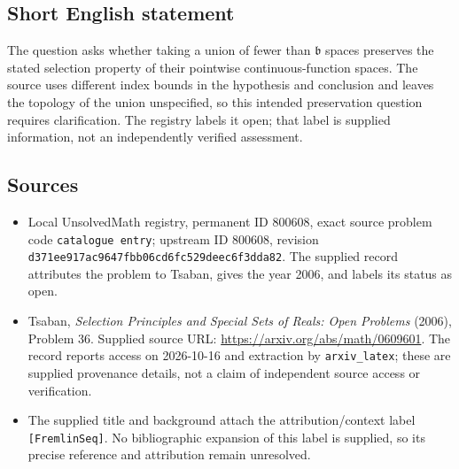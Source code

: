 \documentclass[11pt]{article}
\begin{document}
\subsection{Short English statement}
The question asks whether taking a union of fewer than \(\mathfrak b\) spaces preserves the stated selection property of their pointwise continuous-function spaces. The source uses different index bounds in the hypothesis and conclusion and leaves the topology of the union unspecified, so this intended preservation question requires clarification. The registry labels it open; that label is supplied information, not an independently verified assessment.
\subsection{Sources}
\begin{itemize}
\item Local UnsolvedMath registry, permanent ID \(800608\), exact source problem code \texttt{catalogue entry}; upstream ID \(800608\), revision \texttt{d371ee917ac9647fbb06cd6fc529deec6f3dda82}. The supplied record attributes the problem to Tsaban, gives the year 2006, and labels its status as open.
\item Tsaban, \emph{Selection Principles and Special Sets of Reals: Open Problems} (2006), Problem 36. Supplied source URL: \url{https://arxiv.org/abs/math/0609601}. The record reports access on 2026-10-16 and extraction by \texttt{arxiv\_latex}; these are supplied provenance details, not a claim of independent source access or verification.
\item The supplied title and background attach the attribution/context label \texttt{[FremlinSeq]}. No bibliographic expansion of this label is supplied, so its precise reference and attribution remain unresolved.
\end{itemize}
\end{document}
